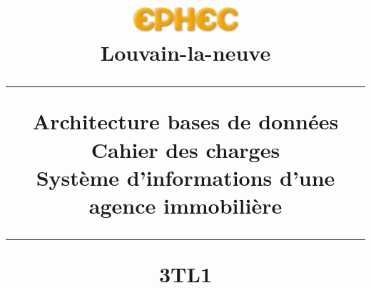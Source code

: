 \title{
\parbox{15cm}
{\includegraphics[width=4cm]{ephec.png} \\ 
  Louvain-la-neuve\\
  \vspace{3cm}
	\begin{center}\sf\bfseries\Huge
		\rule{15cm}{1pt}
		\medskip
		Architecture bases de données\\
		\huge Cahier des charges\\
		\vspace{.5cm}
		\Large Système d'informations d'une agence immobilière
		\vspace{.5cm}
		\rule{15cm}{1pt}
		\large 3TL1
	\end{center}
	\vspace{3cm}
}} 